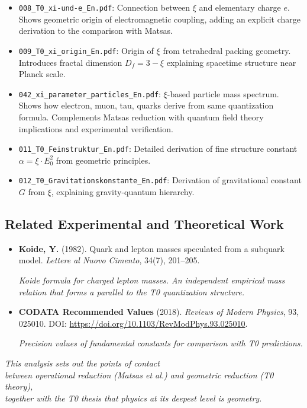 	\begin{itemize}
		\item \texttt{008\_T0\_xi-und-e\_En.pdf}: Connection between $\xi$ and elementary charge $e$. Shows geometric origin of electromagnetic coupling, adding an explicit charge derivation to the comparison with Matsas.
		
		\item \texttt{009\_T0\_xi\_origin\_En.pdf}: Origin of $\xi$ from tetrahedral packing geometry. Introduces fractal dimension $D_f = 3 - \xi$ explaining spacetime structure near Planck scale.
		
		\item \texttt{042\_xi\_parameter\_particles\_En.pdf}: $\xi$-based particle mass spectrum. Shows how electron, muon, tau, quarks derive from same quantization formula. Complements Matsas reduction with quantum field theory implications and experimental verification.
		
		\item \texttt{011\_T0\_Feinstruktur\_En.pdf}: Detailed derivation of fine structure constant $\alpha = \xi \cdot E_0^2$ from geometric principles.
		
		\item \texttt{012\_T0\_Gravitationskonstante\_En.pdf}: Derivation of gravitational constant $G$ from $\xi$, explaining gravity-quantum hierarchy.
	\end{itemize}
	
	\subsection{Related Experimental and Theoretical Work}
	
	\begin{itemize}
		\item \textbf{Koide, Y.} (1982). Quark and lepton masses speculated from a subquark model. \textit{Lettere al Nuovo Cimento}, 34(7), 201--205. 
		
		\textit{Koide formula for charged lepton masses. An independent empirical mass relation that forms a parallel to the T0 quantization structure.}
		
		\item \textbf{CODATA Recommended Values} (2018). \textit{Reviews of Modern Physics}, 93, 025010. DOI: \url{https://doi.org/10.1103/RevModPhys.93.025010}. 
		
		\textit{Precision values of fundamental constants for comparison with T0 predictions.}
	\end{itemize}
	
	\vspace{1cm}
	
	\begin{center}
		\textit{This analysis sets out the points of contact\\
		between operational reduction (Matsas et al.) and geometric reduction (T0 theory),\\
		together with the T0 thesis that physics at its deepest level is geometry.}
	\end{center}
	